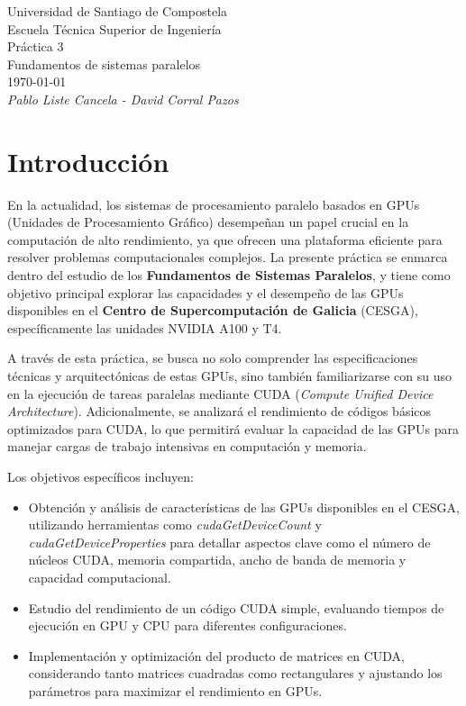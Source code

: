 \documentclass{article}
\begin{document}
\begin{titlepage}
	\centering
	{\LARGE Universidad de Santiago de Compostela}\\
	\vspace{1.5cm}
	{\Large Escuela Técnica Superior de Ingeniería}\\
	\vspace{3cm}
	{\Huge Práctica 3}\\
	\vspace{0.5cm}
	\bigskip
	{\large Fundamentos de sistemas paralelos\\ \today}\\
	\vspace{3cm}
	{\Large \textit{Pablo Liste Cancela - David Corral Pazos}}
	\vfill
\end{titlepage}

\section{Introducción}

	En la actualidad, los sistemas de procesamiento paralelo basados en GPUs (Unidades de Procesamiento Gráfico) desempeñan un papel crucial en la computación de alto rendimiento, ya que ofrecen una plataforma eficiente para resolver problemas computacionales complejos. La presente práctica se enmarca dentro del estudio de los \textbf{Fundamentos de Sistemas Paralelos}, y tiene como objetivo principal explorar las capacidades y el desempeño de las GPUs disponibles en el \textbf{Centro de Supercomputación de Galicia} (CESGA), específicamente las unidades NVIDIA A100 y T4.

	A través de esta práctica, se busca no solo comprender las especificaciones técnicas y arquitectónicas de estas GPUs, sino también familiarizarse con su uso en la ejecución de tareas paralelas mediante CUDA (\textit{Compute Unified Device Architecture}). Adicionalmente, se analizará el rendimiento de códigos básicos optimizados para CUDA, lo que permitirá evaluar la capacidad de las GPUs para manejar cargas de trabajo intensivas en computación y memoria.

	Los objetivos específicos incluyen:

	\begin{itemize}

		\item Obtención y análisis de características de las GPUs disponibles en el CESGA, utilizando herramientas como \textit{cudaGetDeviceCount} y \textit{cudaGetDeviceProperties} para detallar aspectos clave como el número de núcleos CUDA, memoria compartida, ancho de banda de memoria y capacidad computacional.

		\item Estudio del rendimiento de un código CUDA simple, evaluando tiempos de ejecución en GPU y CPU para diferentes configuraciones.

		\item Implementación y optimización del producto de matrices en CUDA, considerando tanto matrices cuadradas como rectangulares y ajustando los parámetros para maximizar el rendimiento en GPUs.

	\end{itemize}
\end{document}
